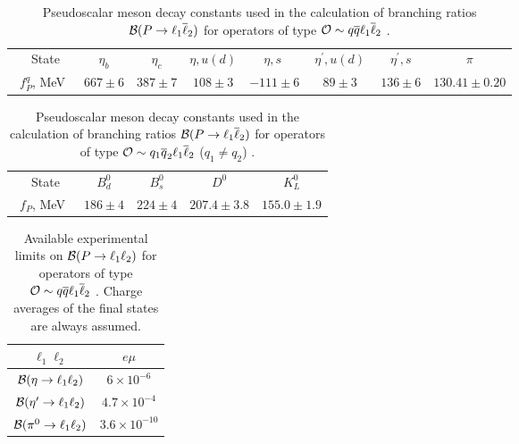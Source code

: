 \documentclass[12pt]{article}
\begin{document}
\begin{table}
\begin{center}
\footnotesize
\begin{tabular}{c|ccccccc}
\hline\hline
~State & $~\eta_b~$ & $~\eta_c~$ & $\eta, u(d)$ & $~\eta, s$~  & $~\eta^\prime, u(d)~$  & $~\eta^\prime, s~$ & $~\pi~$\\
~$f_P^q$, MeV~ &  $667 \pm 6$   &  $387\pm 7$ &  $108\pm 3$ &  $-111\pm 6$ &  $89\pm 3$ &   $136\pm 6$&   $130.41 \pm 0.20$ \\
\hline\hline
\end{tabular}
\normalsize
\end{center}
\caption{Pseudoscalar meson decay constants used in the calculation of branching ratios ${\cal B}(P \to \ell_1 \overline \ell_2)$ for operators of type ${\cal O} \sim q \overline{q} \ell_1 \overline{\ell}_2$ \cite{Becirevic:2013bsa,PDG,McNeile:2012qf,Beneke:2002jn}.}
\label{tab:Pdecay_constants} 
\end{table} 

\begin{table*}
\begin{center}
\footnotesize
\begin{tabular}{c|cccc}
\hline \hline
~State & $B^0_d$ & $B^0_s$ & $D^0$ & $K^0_L$ \\
~$f_P$, MeV~ &  $186 \pm 4$   &  $224 \pm 4$ &  $207.4 \pm 3.8$ &  $155.0 \pm 1.9$ \\
\hline \hline
\end{tabular}
\end{center}
\caption{\label{tab:Pdecayconstants} Pseudoscalar meson decay constants used in the calculation of branching ratios ${\cal B}(P \to \ell_1 \overline \ell_2)$ for operators of type ${\cal O} \sim q_1 \overline{q}_2 \ell_1 \overline{\ell}_2$ ($q_1 \neq q_2$) \cite{Dowdall:2013tga,Carrasco:2014poa}.}
\end{table*} 

\begin{table*}
\begin{center}
\footnotesize
\begin{tabular}{cc}
\hline \hline
$\ell_1 \ell_2$ & $e \mu$  \\ 
\hline
${\cal B}(\eta \to \ell_1 \ell_2)$ & $6 \times 10^{-6}$ \\ 
%
${\cal B}(\eta^{\prime} \to \ell_1 \ell_2)$ & $4.7 \times 10^{-4}$ \\
%
${\cal B}(\pi^0 \to \ell_1 \ell_2)$ & $3.6 \times 10^{-10}$ \\
\hline \hline
\end{tabular}
\end{center}
\caption{\label{tab:Pdecaylimitsqq} Available experimental limits on ${\cal B}(P \to \ell_1 \ell_2)$ for operators of type ${\cal O} \sim q \overline{q} \ell_1 \overline{\ell}_2$ \cite{PDG}. Charge averages of the final states are always assumed.}
\end{table*}
\end{document}
